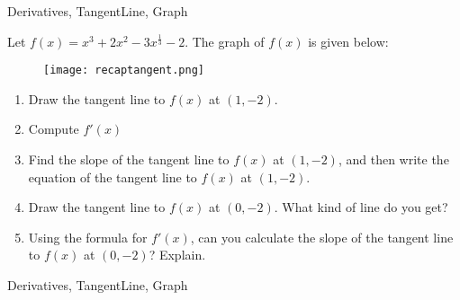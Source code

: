 
\begin{tagblock}{Derivatives, TangentLine, Graph}
\begin{question}
	

\bigskip



Let $\displaystyle f(x) = x^3 +2x^2-3x^{\frac{1}{3}}-2$.  The graph of $f(x)$ is given below:
\begin{figure}[h]
\centering
\texttt{[image: recaptangent.png]}  \end{figure}

\begin{enumerate}
\item Draw the tangent line to $f(x)$ at $(1,-2)$.
\item Compute $f'(x)$ 

\vspace{1in}

\item Find the slope of the tangent line to $f(x)$ at $(1,-2)$, and then write the equation of the tangent line to $f(x)$ at $(1,-2)$.
\vspace{1in}

\item Draw the tangent line to $f(x)$ at $(0,-2)$.  What kind of line do you get?
\vspace{.5in}


\item Using the formula for $f'(x)$, can you calculate the slope of the tangent line to $f(x)$ at $(0,-2)$?  Explain.
\vspace{1in}
\end{enumerate}







	
	
\begin{tags}
	    Derivatives, TangentLine, Graph
\end{tags}
	
\begin{diary}
\end{diary}
	
\begin{solution}
	   
\end{solution}
	
\end{question}

\end{tagblock}

